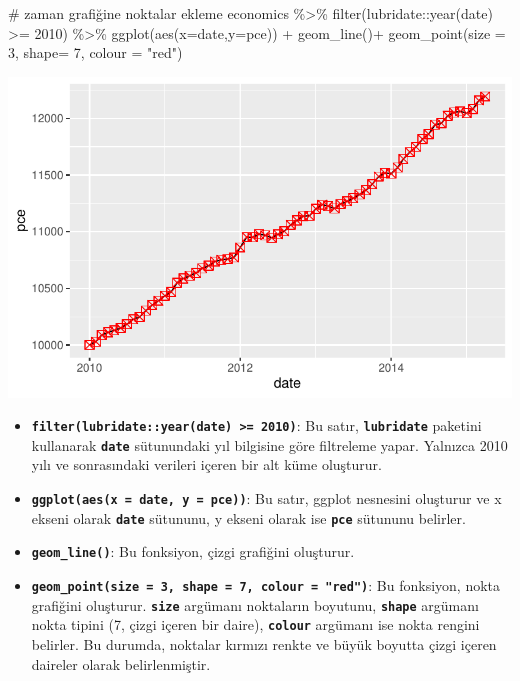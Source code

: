 \documentclass[
  letterpaper,
  DIV=11,
  numbers=noendperiod]{scrreprt}
\newenvironment{Shaded}{\begin{snugshade}}{\end{snugshade}}
\newcommand{\AttributeTok}[1]{\textcolor[rgb]{0.40,0.45,0.13}{#1}}
\newcommand{\CommentTok}[1]{\textcolor[rgb]{0.37,0.37,0.37}{#1}}
\newcommand{\DecValTok}[1]{\textcolor[rgb]{0.68,0.00,0.00}{#1}}
\newcommand{\FunctionTok}[1]{\textcolor[rgb]{0.28,0.35,0.67}{#1}}
\newcommand{\NormalTok}[1]{\textcolor[rgb]{0.00,0.23,0.31}{#1}}
\newcommand{\SpecialCharTok}[1]{\textcolor[rgb]{0.37,0.37,0.37}{#1}}
\newcommand{\StringTok}[1]{\textcolor[rgb]{0.13,0.47,0.30}{#1}}
\begin{document}
\begin{Shaded}
\begin{Highlighting}[]
\CommentTok{\# zaman grafiğine noktalar ekleme}
\NormalTok{economics }\SpecialCharTok{\%\textgreater{}\%} 
  \FunctionTok{filter}\NormalTok{(lubridate}\SpecialCharTok{::}\FunctionTok{year}\NormalTok{(date) }\SpecialCharTok{\textgreater{}=} \DecValTok{2010}\NormalTok{) }\SpecialCharTok{\%\textgreater{}\%} 
  \FunctionTok{ggplot}\NormalTok{(}\FunctionTok{aes}\NormalTok{(}\AttributeTok{x=}\NormalTok{date,}\AttributeTok{y=}\NormalTok{pce)) }\SpecialCharTok{+}
  \FunctionTok{geom\_line}\NormalTok{()}\SpecialCharTok{+}
  \FunctionTok{geom\_point}\NormalTok{(}\AttributeTok{size =} \DecValTok{3}\NormalTok{, }\AttributeTok{shape=} \DecValTok{7}\NormalTok{, }\AttributeTok{colour =} \StringTok{"red"}\NormalTok{)}
\end{Highlighting}
\end{Shaded}

\includegraphics{ggplot2_files/figure-pdf/unnamed-chunk-24-1.pdf}

\begin{itemize}
\item
  \textbf{\texttt{filter(lubridate::year(date)\ \textgreater{}=\ 2010)}}:
  Bu satır, \textbf{\texttt{lubridate}} paketini kullanarak
  \textbf{\texttt{date}} sütunundaki yıl bilgisine göre filtreleme
  yapar. Yalnızca 2010 yılı ve sonrasındaki verileri içeren bir alt küme
  oluşturur.
\item
  \textbf{\texttt{ggplot(aes(x\ =\ date,\ y\ =\ pce))}}: Bu satır,
  ggplot nesnesini oluşturur ve x ekseni olarak \textbf{\texttt{date}}
  sütununu, y ekseni olarak ise \textbf{\texttt{pce}} sütununu belirler.
\item
  \textbf{\texttt{geom\_line()}}: Bu fonksiyon, çizgi grafiğini
  oluşturur.
\item
  \textbf{\texttt{geom\_point(size\ =\ 3,\ shape\ =\ 7,\ colour\ =\ "red")}}:
  Bu fonksiyon, nokta grafiğini oluşturur. \textbf{\texttt{size}}
  argümanı noktaların boyutunu, \textbf{\texttt{shape}} argümanı nokta
  tipini (7, çizgi içeren bir daire), \textbf{\texttt{colour}} argümanı
  ise nokta rengini belirler. Bu durumda, noktalar kırmızı renkte ve
  büyük boyutta çizgi içeren daireler olarak belirlenmiştir.
\end{itemize}
\end{document}
